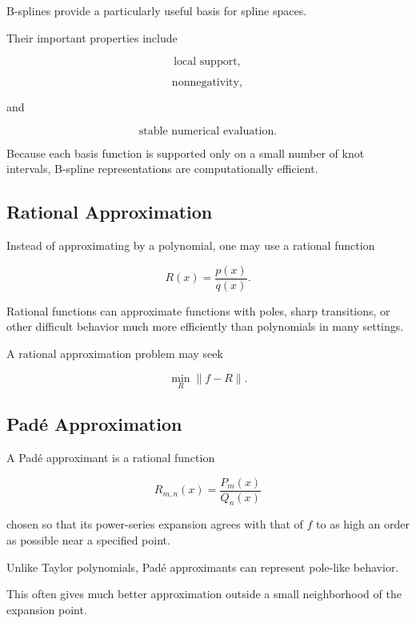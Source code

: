 B-splines provide a particularly useful basis for spline spaces.

Their important properties include

\[
\boxed{
\text{local support},
}
\]

\[
\boxed{
\text{nonnegativity},
}
\]

and

\[
\boxed{
\text{stable numerical evaluation}.
}
\]

Because each basis function is supported only on a small number of knot
intervals, B-spline representations are computationally efficient.

\subsection{Rational Approximation}
\label{subsec:rational-approximation}

Instead of approximating by a polynomial, one may use a rational function

\[
\boxed{
R(x)
=
\frac{p(x)}{q(x)}.
}
\]

Rational functions can approximate functions with poles, sharp
transitions, or other difficult behavior much more efficiently than
polynomials in many settings.

A rational approximation problem may seek

\[
\boxed{
\min_{R}
\|f-R\|.
}
\]

\subsection{Pad\'e Approximation}
\label{subsec:pade-approximation}

A Pad\'e approximant is a rational function

\[
\boxed{
R_{m,n}(x)
=
\frac{P_m(x)}{Q_n(x)}
}
\]

chosen so that its power-series expansion agrees with that of \(f\) to
as high an order as possible near a specified point.

Unlike Taylor polynomials, Pad\'e approximants can represent pole-like
behavior.

This often gives much better approximation outside a small neighborhood
of the expansion point.

